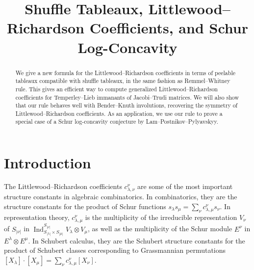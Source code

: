 \documentclass[ALCO,Unicode]{cedram}
\title
[Shuffle Tableaux]
{Shuffle Tableaux, Littlewood--Richardson Coefficients, and Schur Log-Concavity}
\author{\firstname{Chau} \lastname{Nguyen}}
\author{\firstname{Son}  \lastname{Nguyen}}
\author{\firstname{Dora}  \lastname{Woodruff}}
\begin{document}


\begin{abstract}
  We give a new formula for the Littlewood--Richardson coefficients in terms of peelable tableaux compatible with shuffle tableaux, in the same fashion as Remmel--Whitney rule. This gives an efficient way to compute generalized Littlewood--Richardson coefficients for Temperley--Lieb immanants of Jacobi--Trudi matrices. We will also show that our rule behaves well with Bender--Knuth involutions, recovering the symmetry of Littlewood--Richardson coefficients. As an application, we use our rule to prove a special case of a Schur log-concavity conjecture by Lam--Postnikov--Pylyavskyy.
\end{abstract}

\maketitle

\theoremstyle{definition}

\theoremstyle{remark}

\section{Introduction}

    The Littlewood--Richardson coefficients $c_{\lambda,\nu}^\nu$ are some of the most important structure constants in algebraic combinatorics. In combinatorics, they are the structure constants for the product of Schur functions $s_\lambda s_\mu = \sum_\nu c_{\lambda,\mu}^\nu s_\nu$. In representation theory, $c_{\lambda,\mu}^{\nu}$ is the multiplicity of the irreducible representation $V_{\nu}$ of $S_{|\nu|}$ in $\operatorname{Ind}_{S_{|\lambda|}\times S_{|\mu|}}^{S_{|\nu|}}V_\lambda\otimes V_\mu$, as well as the multiplicity of the Schur module $E^{\nu}$ in $E^{\lambda}\otimes E^{\mu}$. In Schubert calculus, they are the Schubert structure constants for the product of Schubert classes corresponding to Grassmannian permutations $[X_{\lambda}]\cdot[X_\mu] = \sum_\nu c_{\lambda,\mu}^\nu[X_\nu]$.
\end{document}
